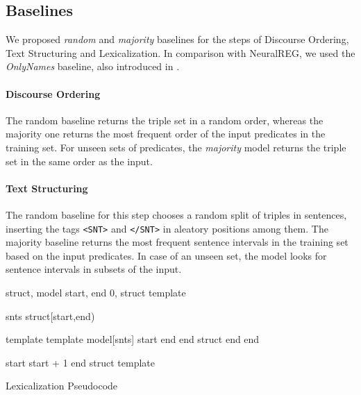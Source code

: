 \documentclass[11pt,a4paper]{article}
\begin{document}
\subsection{Baselines}

We proposed \textit{random} and \textit{majority} baselines for the steps of Discourse Ordering, Text Structuring and Lexicalization. In comparison with NeuralREG, we used the \textit{OnlyNames} baseline, also introduced in \citet{ferreira2018}. 

\paragraph{Discourse Ordering} The random baseline returns the triple set in a random order, whereas the majority one returns the most frequent order of the input predicates in the training set. For unseen sets of predicates, the \textit{majority} model returns the triple set in the same order as the input.







\paragraph{Text Structuring} The random baseline for this step chooses a random split of triples in sentences, inserting the tags \texttt{<SNT>} and \texttt{</SNT>} in aleatory positions among them. The majority baseline returns the most frequent sentence intervals in the training set based on the input predicates. In case of an unseen set, the model looks for sentence intervals in subsets of the input.

\begin{algorithm}
\footnotesize{
\begin{algorithmic}[1]
\Require struct, model 
    \State start, end  0, struct
    \State template 
    
        \State snts  struct[start,end)
        
            \State template  template  model[snts]
            \State start  end
            \State end struct
        \Else
            \State end  end 
            
                \State start  start + 1
                \State end struct
            \EndIf
        \EndIf
    \EndWhile
    \State \Return template
\end{algorithmic}
}
\caption{Lexicalization Pseudocode}
\label{alg:lex}
\end{algorithm}
\end{document}
